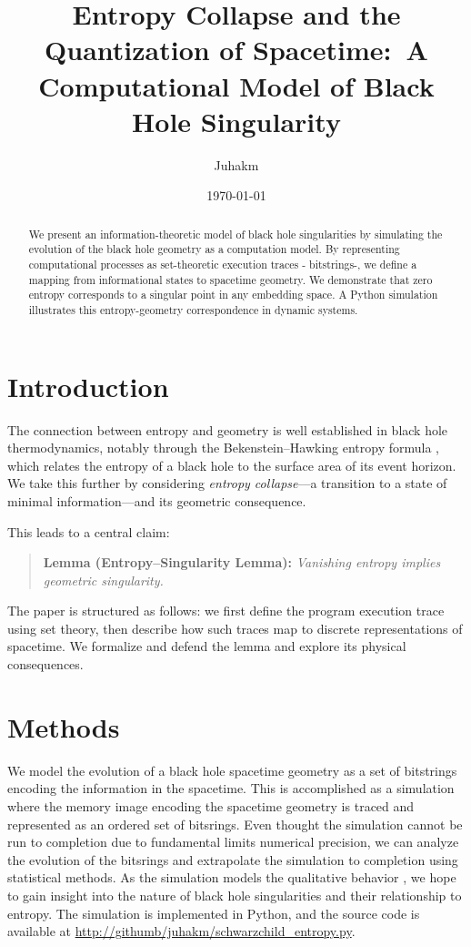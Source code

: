 \documentclass[11pt]{article}
\title{Entropy Collapse and the Quantization of Spacetime:\ A Computational Model of Black Hole Singularity}
\author{Juhakm}
\date{\today}
\begin{document}
\maketitle

\begin{abstract}
  We present an information-theoretic model of black hole singularities by simulating the evolution of the black hole geometry as a computation model. By representing computational processes as set-theoretic execution traces - bitstrings-, we define a mapping
  from informational states to spacetime geometry. We demonstrate that zero entropy corresponds to a singular point in any
  embedding space. A Python simulation illustrates this entropy-geometry correspondence in dynamic systems.
\end{abstract}

\section{Introduction}

The connection between entropy and geometry is well established in black hole thermodynamics, notably through the Bekenstein--Hawking entropy formula \cite{Bekenstein1973,Hawking1975}, which relates the entropy of a black hole to the surface area of its event horizon. We take this further by considering \emph{entropy collapse}---a transition to a state of minimal information---and its geometric consequence.

This leads to a central claim:

\begin{quote}
  \textbf{Lemma (Entropy--Singularity Lemma):} \emph{Vanishing entropy implies geometric singularity.}
\end{quote}

The paper is structured as follows: we first define the program execution trace using set theory, then describe how such traces map to discrete representations of spacetime. We formalize and defend the lemma and explore its physical consequences.

\section{Methods}

We model the evolution of a black hole spacetime geometry as a set of bitstrings encoding the information in the spacetime. This is accomplished as a simulation where the memory image encoding the spacetime geometry is traced and represented as an ordered set of bitsrings. Even thought the simulation cannot be run to  completion due to  fundamental limits numerical precision, we can analyze the evolution of the bitsrings and extrapolate the simulation to completion using statistical methods. As the simulation
models the qualitative behavior , we hope to gain insight into the nature of black hole singularities and their relationship to entropy.
The simulation is implemented in Python, and the source code is available at \url{http://githumb/juhakm/schwarzchild\_entropy.py}.
\end{document}
